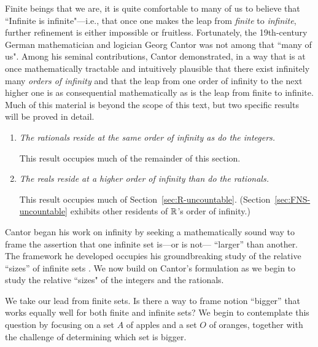   
Finite beings that we are, it is quite comfortable to many of us to believe that ``Infinite is infinite"---i.e., that once one makes the leap from {\em finite} to {\em infinite}, further refinement is either impossible or fruitless.  Fortunately, the 19th-century German mathematician and logician Georg Cantor was not among that ``many of us".  Among his seminal contributions, Cantor demonstrated, in a way that is at once mathematically tractable and intuitively plausible that there exist infinitely many {\em orders of infinity} and that the leap from one order of infinity to the next higher one is as consequential mathematically as is the leap from finite to infinite.  Much of this material is beyond the scope of this text, but two specific results will be proved in detail.
\begin{enumerate}
\item
{\em The rationals reside at the same order of infinity as do the integers.}

\smallskip

This result occupies much of the remainder of this section.
\item
{\em The reals reside at a higher order of infinity than do the rationals.}

\smallskip

This result occupies much of Section~\ref{sec:R-uncountable}.  (Section~\ref{sec:FNS-uncountable} exhibits other residents of $\mathbb{R}$'s order of infinity.)
\end{enumerate}

\medskip

Cantor began his work on infinity by seeking a mathematically sound way to frame the assertion that one infinite set is---or is not--- ``larger'' than another.  The framework he developed occupies his groundbreaking study of the relative ``sizes'' of infinite sets \cite{Cantor74,Cantor78}.  We now build on Cantor's formulation as we begin to study the relative ``sizes" of the integers and the rationals.

\medskip

We take our lead from finite sets.  Is there a way to frame notion ``bigger'' that works equally well for both finite and infinite sets?  We begin to contemplate this question by focusing on a set $A$ of apples and a set $O$ of oranges, together with the challenge of determining which set is bigger.

\medskip

